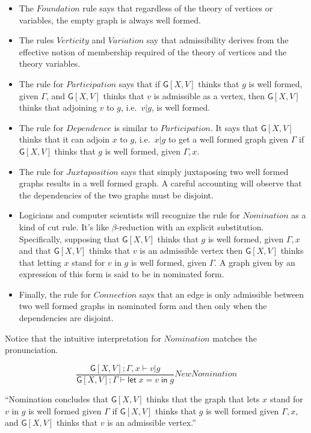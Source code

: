 \documentclass[12pt]{llncs}
\begin{document}
\begin{itemize}
\item
  The \(Foundation\) rule says that regardless of the theory of vertices
  or variables, the empty graph is always well formed.
\item
  The rules \(Verticity\) and \(Variation\) say that admissibility
  derives from the effective notion of membership required of the theory
  of vertices and the theory variables.
\item
  The rule for \(Participation\) says that if \(\mathsf{G}[X,V]\) thinks
  that \(g\) is well formed, given \(\Gamma\), and \(\mathsf{G}[X,V]\)
  thinks that \(v\) is admissible as a vertex, then \(\mathsf{G}[X,V]\)
  thinks that adjoining \(v\) to \(g\), i.e.~\(v|g\), is well formed.
\item
  The rule for \(Dependence\) is similar to \(Participation\). It says
  that \(\mathsf{G}[X,V]\) thinks that it can adjoin \(x\) to \(g\),
  i.e.~\(x|g\) to get a well formed graph given \(\Gamma\) if
  \(\mathsf{G}[X,V]\) thinks that \(g\) is well formed, given
  \(\Gamma,x\).
\item
  The rule for \(Juxtaposition\) says that simply juxtaposing two well
  formed graphs results in a well formed graph. A careful accounting
  will observe that the dependencies of the two graphs must be disjoint.
\item
  Logicians and computer scientists will recognize the rule for
  \(Nomination\) as a kind of cut rule. It's like \(\beta\)-reduction
  with an explicit substitution. Specifically, supposing that
  \(\mathsf{G}[X,V]\) thinks that \(g\) is well formed, given
  \(\Gamma,x\) and that \(\mathsf{G}[X,V]\) thinks that \(v\) is an
  admissible vertex then \(\mathsf{G}[X,V]\) thinks that letting \(x\)
  stand for \(v\) in \(g\) is well formed, given \(\Gamma\). A graph
  given by an expression of this form is said to be in nominated form.
\item
  Finally, the rule for \(Connection\) says that an edge is only
  admissible between two well formed graphs in nominated form and then
  only when the dependencies are disjoint.
\end{itemize}

Notice that the intuitive interpretation for \(Nomination\) matches the
pronunciation.

\[\frac{ \mathsf{G}[X,V];\Gamma,x \vdash v|g}{ \mathsf{G}[X,V]; \Gamma \vdash \mathsf{let}\; x = v \; \mathsf{in}\; g}NewNomination\]

``Nomination concludes that \(\mathsf{G}[X,V]\) thinks that the graph
that lets \(x\) stand for \(v\) in \(g\) is well formed given \(\Gamma\)
if \(\mathsf{G}[X,V]\) thinks that \(g\) is well formed given
\(\Gamma,x\), and \(\mathsf{G}[X,V]\) thinks that \(v\) is an admissible
vertex.''
\end{document}

